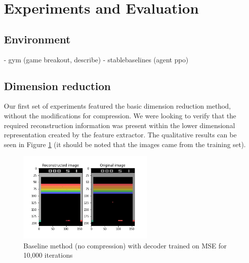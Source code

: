 \section{Experiments and Evaluation}
\subsection{Environment}
- gym (game breakout, describe)
- stablebaselines (agent ppo)



\subsection{Dimension reduction}
Our first set of experiments featured the basic dimension reduction method,
without the modifications for compression. We were looking to verify that the
required reconstruction information was present within the lower dimensional
representation created by the feature extractor. The qualitative results can be
seen in Figure \ref{fig:baseline_MSE} (it should be noted that the images came
from the training set). \\

\begin{figure}[H]
    \centering
    \includegraphics[width=0.6\textwidth]{images/orig_reconstructed0.0.png}
    \caption{Baseline method (no compression) with decoder trained on MSE for 10,000 iterations}
    \label{fig:baseline_MSE}
\end{figure}


